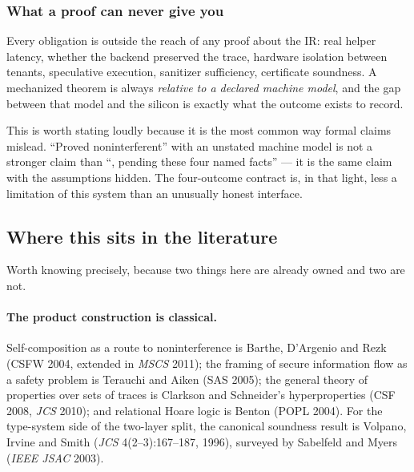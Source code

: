 \subsubsection*{What a proof can never give you}

Every  obligation is outside the reach of any proof about the IR: real
helper latency, whether the backend preserved the trace, hardware isolation
between tenants, speculative execution, sanitizer sufficiency, certificate
soundness. A mechanized theorem is always \emph{relative to a declared machine
model}, and the gap between that model and the silicon is exactly what the
\Conditional{} outcome exists to record.

This is worth stating loudly because it is the most common way formal claims
mislead. ``Proved noninterferent'' with an unstated machine model is not a
stronger claim than ``\Conditional{}, pending these four named facts'' --- it is
the same claim with the assumptions hidden. The four-outcome contract is, in that
light, less a limitation of this system than an unusually honest interface.

\subsection{Where this sits in the literature}
\label{sec:positioning}

Worth knowing precisely, because two things here are already owned and two are
not.

\paragraph{The product construction is classical.} Self-composition as a route to
noninterference is Barthe, D'Argenio and Rezk (CSFW 2004, extended in
\emph{MSCS} 2011); the framing of secure information flow as a safety problem is
Terauchi and Aiken (SAS 2005); the general theory of properties over sets of
traces is Clarkson and Schneider's hyperproperties (CSF 2008, \emph{JCS} 2010);
and relational Hoare logic is Benton (POPL 2004). For the type-system side of the
two-layer split, the canonical soundness result is Volpano, Irvine and Smith
(\emph{JCS} 4(2--3):167--187, 1996), surveyed by Sabelfeld and Myers
(\emph{IEEE JSAC} 2003).

